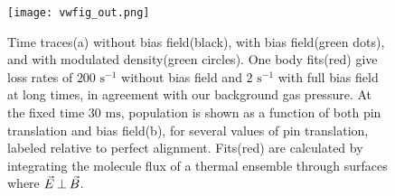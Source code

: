 \documentclass[%
 reprint,
 amsmath,amssymb,
 aps,
prl,
]{revtex4-1}
\newcommand{\bcl}{{$B_\text{coil}$}}
\newcommand{\epb}{{$\vec{E}\s {\perp}\s\vec{B}$}}
\newcommand{\s}{{\nobreak\hspace{.2em}}}
\begin{document}
%


\begin{figure}[tb]
\texttt{[image: vwfig\_out.png]}%
\caption{
Time traces\s(a) without bias field\s(black), with bias field\s(green dots), and with modulated density\s(green circles).
One body fits\s(red) give loss rates of $200\text{ s}^{-1}$ without bias field and $2\text{ s}^{-1}$ with full bias field at long times, in agreement with our background gas pressure.
At the fixed time $30\text{ ms}$, population is shown as a function of both pin translation and bias field\s(b), for several values of pin translation, labeled relative to perfect alignment.
Fits\s(red) are calculated by integrating the molecule flux of a thermal ensemble through surfaces where \epb.
\label{fig:WVplot}}
\end{figure}
\end{document}
